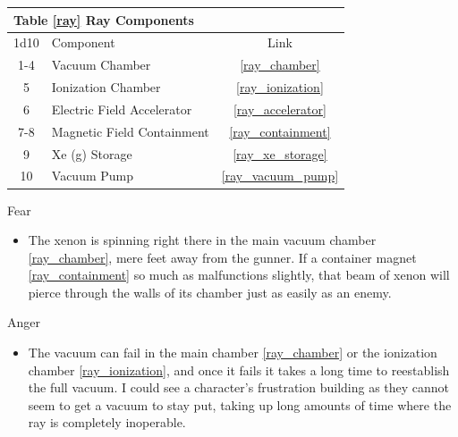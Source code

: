 \documentclass[a4paper]{article}
\begin{document}
\vspace{0.5cm} \hspace{0.25\linewidth}
\def\ray_components{
\begin{tabular}[t]{@{} | c | l | c | @{}}
\toprule
\multicolumn{3}{|l|}{Table \ref{ray} Ray Components} \\
\toprule
1d10 & Component & Link \\
\midrule
1-4 & Vacuum Chamber & \ref{ray_chamber} \\
5 & Ionization Chamber & \ref{ray_ionization} \\
6 & Electric Field Accelerator & \ref{ray_accelerator} \\
7-8 & Magnetic Field Containment & \ref{ray_containment} \\
9 & Xe (g) Storage & \ref{ray_xe_storage} \\
10 & Vacuum Pump & \ref{ray_vacuum_pump} \\
\bottomrule
\end{tabular}
}
\ray_components

\vspace{0.3cm}
\begin{minipage}[t]{0.4\linewidth}
Fear
\begin{itemize}
\item The xenon is spinning right there in the main vacuum chamber \ref{ray_chamber}, mere feet away from the gunner. If a container magnet \ref{ray_containment} so much as malfunctions slightly, that beam of xenon will pierce through the walls of its chamber just as easily as an enemy. 
\end{itemize}
\end{minipage} 
\begin{minipage}[t]{0.4\linewidth}
Anger
\begin{itemize}
\item The vacuum can fail in the main chamber \ref{ray_chamber} or the ionization chamber \ref{ray_ionization}, and once it fails it takes a long time to reestablish the full vacuum. I could see a character's frustration building as they cannot seem to get a vacuum to stay put, taking up long amounts of time where the ray is completely inoperable.
\end{itemize}
\end{minipage}
\end{document}
